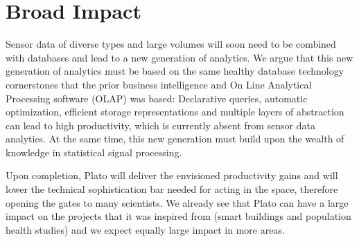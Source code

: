 \section{Broad Impact}
\label{sec:broad-impact}
Sensor data of diverse types and large volumes will soon need to be combined with databases and lead to a new generation of analytics. We argue that this new generation of analytics must be based on the same healthy database technology cornerstones that the prior business intelligence and On Line Analytical Processing software (OLAP) was based: Declarative queries, automatic optimization, efficient storage representations and multiple layers of abstraction can lead to high productivity, which is currently absent from sensor data analytics. At the same time, this new generation must build upon the wealth of knowledge in statistical signal processing. 

Upon completion, Plato will deliver the envisioned productivity gains and will lower the technical sophistication bar needed for acting in the space, therefore opening the gates to many scientists. We already see that Plato can have a large impact on the projects that it was inspired from (smart buildings and population health studies) and we expect equally large impact in more areas.

